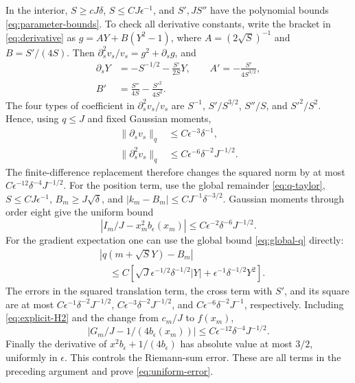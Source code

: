 \documentclass[aps,pra,reprint,superscriptaddress,longbibliography]{revtex4-2}
\theoremstyle{remark}
\newcommand{\norm}[1]{\lVert#1\rVert}
\begin{document}
In the interior, $S\geq cJ\delta$, $S\leq CJ\epsilon^{-1}$,
and $S',JS''$ have the polynomial bounds \eqref{eq:parameter-bounds}.
To check all derivative constants, write the bracket in
\eqref{eq:derivative} as
$g=A Y+B(Y^2-1)$, where $A=(2\sqrt S)^{-1}$ and $B=S'/(4S)$.
Then $\partial_s^2v_s/v_s=g^2+\partial_sg$, and
\begin{align*}
 \partial_sY&=-S^{-1/2}-\frac{S'}{2S}Y,\qquad
 A'=-\frac{S'}{4S^{3/2}},\\
 B'&=\frac{S''}{4S}-\frac{S'^2}{4S^2}.
\end{align*}
The four types of coefficient in $\partial_s^2v_s/v_s$ are
$S^{-1}$, $S'/S^{3/2}$, $S''/S$, and $S'^2/S^2$. Hence, using
$q\leq J$ and fixed Gaussian moments,
\begin{equation}
\begin{aligned}
\norm{\partial_sv_s}_q&\leq C\epsilon^{-3}\delta^{-1},\\
\norm{\partial_s^2v_s}_q&\leq C\epsilon^{-6}\delta^{-2}J^{-1/2}.
\end{aligned}
\label{eq:explicit-H2}
\end{equation}
The finite-difference replacement therefore changes the squared
norm by at most $C\epsilon^{-12}\delta^{-4}J^{-1/2}$.
For the position term, use the global remainder
\eqref{eq:q-taylor}, $S\leq CJ\epsilon^{-1}$,
$B_m\geq J\sqrt\delta$, and
$|k_m-B_m|\leq CJ^{-1}\delta^{-3/2}$.
Gaussian moments through order eight give the uniform bound
\begin{equation}
 \left|I_m/J-x_m^2b_\epsilon(x_m)\right|
 \leq C\epsilon^{-2}\delta^{-6}J^{-1/2}.
 \label{eq:explicit-I}
\end{equation}
For the gradient expectation one can use the global bound
\eqref{eq:global-q} directly:
\begin{align*}
 &|q(m+\sqrt S Y)-B_m|\\
 &\quad\leq C\left[\sqrt J\epsilon^{-1/2}\delta^{-1/2}|Y|
             +\epsilon^{-1}\delta^{-1/2}Y^2\right].
\end{align*}
The errors in the squared translation term, the cross term with
$S'$, and its square are at most
$C\epsilon^{-1}\delta^{-2}J^{-1/2}$,
$C\epsilon^{-3}\delta^{-2}J^{-1/2}$, and
$C\epsilon^{-6}\delta^{-2}J^{-1}$, respectively. Including
\eqref{eq:explicit-H2} and the change from $c_m/J$ to $f(x_m)$,
\begin{equation}
 \left|G_m/J-1/(4b_\epsilon(x_m))\right|
 \leq C\epsilon^{-12}\delta^{-4}J^{-1/2}.
 \label{eq:explicit-G}
\end{equation}
Finally the derivative of $x^2b_\epsilon+1/(4b_\epsilon)$ has
absolute value at most $3/2$, uniformly in $\epsilon$.
This controls the Riemann-sum error. These
are all terms in the preceding argument and prove
\eqref{eq:uniform-error}.
\end{document}
